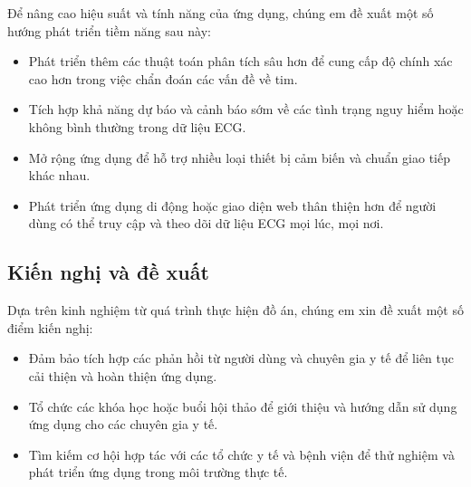 Để nâng cao hiệu suất và tính năng của ứng dụng, chúng em đề xuất một số hướng phát triển tiềm năng sau này:

\begin{adjustwidth}{1.5em}{}
  \begin{itemize}
      \item Phát triển thêm các thuật toán phân tích sâu hơn để cung cấp độ chính xác cao hơn trong việc chẩn đoán các vấn đề về tim.

  
      \item Tích hợp khả năng dự báo và cảnh báo sớm về các tình trạng nguy hiểm hoặc không bình thường trong dữ liệu ECG.

  
      \item Mở rộng ứng dụng để hỗ trợ nhiều loại thiết bị cảm biến và chuẩn giao tiếp khác nhau.

  
      \item  Phát triển ứng dụng di động hoặc giao diện web thân thiện hơn để người dùng có thể truy cập và theo dõi dữ liệu ECG mọi lúc, mọi nơi.

  \end{itemize}
  \end{adjustwidth}


\subsection*{Kiến nghị và đề xuất}


Dựa trên kinh nghiệm từ quá trình thực hiện đồ án, chúng em xin đề xuất một số điểm kiến nghị:

\begin{adjustwidth}{1.5em}{}
  \begin{itemize}
      \item Đảm bảo tích hợp các phản hồi từ người dùng và chuyên gia y tế để liên tục cải thiện và hoàn thiện ứng dụng.

  
      \item Tổ chức các khóa học hoặc buổi hội thảo để giới thiệu và hướng dẫn sử dụng ứng dụng cho các chuyên gia y tế.

  
      \item Tìm kiếm cơ hội hợp tác với các tổ chức y tế và bệnh viện để thử nghiệm và phát triển ứng dụng trong môi trường thực tế.

    \end{itemize}
  \end{adjustwidth}



\cleardoublepage